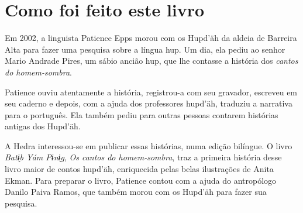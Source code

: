 \chapter{Como foi feito este livro}

Em 2002, a linguista Patience Epps morou com os Hupd’äh da aldeia de Barreira Alta para fazer uma pesquisa sobre a língua hup. Um dia, ela pediu ao senhor Mario Andrade Pires, um sábio ancião hup, que lhe contasse a história dos \textit{cantos do homem-sombra}.

Patience ouviu atentamente a história, registrou-a com seu gravador, escreveu em seu caderno e depois, com a ajuda dos professores hupd’äh, traduziu a narrativa para o português. Ela também pediu para outras pessoas contarem histórias antigas dos Hupd’äh.


A Hedra interessou-se em publicar essas histórias, numa edição bilíngue. O livro \textit{Batɨ̗b  Yám Pɨnɨ̗g}, \textit{Os cantos do homem-sombra}, traz a primeira história desse livro maior de contos hupd’äh, enriquecida pelas belas ilustrações de Anita Ekman. Para preparar o livro, Patience contou com a ajuda do antropólogo Danilo Paiva Ramos, que também morou com os Hupd’äh para fazer sua pesquisa.



